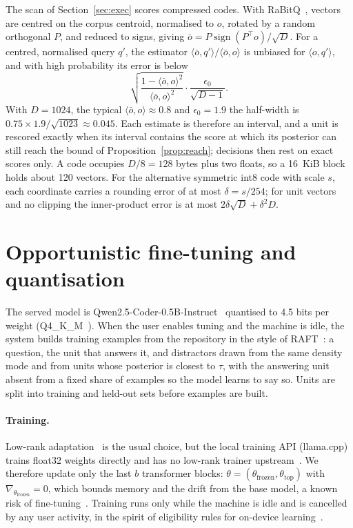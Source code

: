 \documentclass[10pt,twocolumn]{article}
\theoremstyle{definition}
\theoremstyle{remark}
\begin{document}
The scan of Section~\ref{sec:exec} scores compressed codes.
With RaBitQ~\cite{gao2024rabitq}, vectors are centred on the corpus centroid, normalised to $o$, rotated by a random orthogonal $P$, and reduced to signs, giving $\bar o=P\operatorname{sign}(P^\top o)/\sqrt D$.
For a centred, normalised query $q'$, the estimator $\langle\bar o,q'\rangle/\langle\bar o,o\rangle$ is unbiased for $\langle o,q'\rangle$, and with high probability its error is below
\begin{equation}
\sqrt{\frac{1-\langle\bar o,o\rangle^2}{\langle\bar o,o\rangle^2}}\cdot\frac{\epsilon_0}{\sqrt{D-1}} .
\end{equation}
With $D=1024$, the typical $\langle\bar o,o\rangle\approx0.8$ and $\epsilon_0=1.9$ the half-width is $0.75\times1.9/\sqrt{1023}\approx0.045$.
Each estimate is therefore an interval, and a unit is rescored exactly when its interval contains the score at which its posterior can still reach the bound of Proposition~\ref{prop:reach}; decisions then rest on exact scores only.
A code occupies $D/8=128$ bytes plus two floats, so a 16~KiB block holds about 120 vectors.
For the alternative symmetric int8 code with scale $s$, each coordinate carries a rounding error of at most $\delta=s/254$; for unit vectors and no clipping the inner-product error is at most $2\delta\sqrt D+\delta^2D$.

\section{Opportunistic fine-tuning and quantisation}\label{sec:tune}

The served model is Qwen2.5-Coder-0.5B-Instruct~\cite{hui2024qwen25coder} quantised to 4.5 bits per weight (Q4\_K\_M~\cite{kawrakow2023kquants}).
When the user enables tuning and the machine is idle, the system builds training examples from the repository in the style of RAFT~\cite{zhang2024raft}: a question, the unit that answers it, and distractors drawn from the same density mode and from units whose posterior is closest to $\tau$, with the answering unit absent from a fixed share of examples so the model learns to say so.
Units are split into training and held-out sets before examples are built.

\paragraph{Training.}
Low-rank adaptation~\cite{hu2022lora,dettmers2023qlora} is the usual choice, but the local training API (llama.cpp) trains float32 weights directly and has no low-rank trainer upstream~\cite{llamacpp2026training}.
We therefore update only the last $b$ transformer blocks: $\theta=(\theta_{\mathrm{frozen}},\theta_{\mathrm{top}})$ with $\nabla_{\theta_{\mathrm{frozen}}}=0$, which bounds memory and the drift from the base model, a known risk of fine-tuning~\cite{kirkpatrick2017ewc,biderman2024lora}.
Training runs only while the machine is idle and is cancelled by any user activity, in the spirit of eligibility rules for on-device learning~\cite{bonawitz2019scale}.
\end{document}
